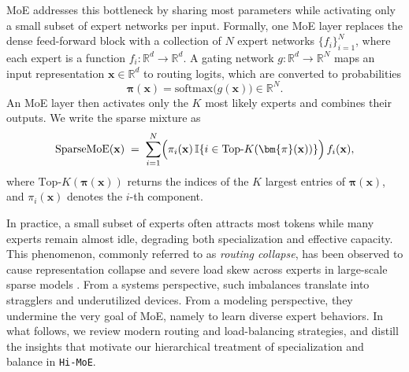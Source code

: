\documentclass[sigconf,nonacm]{acmart}
\newcommand{\x}{\mathbf{x}}
\begin{document}
MoE addresses this bottleneck by sharing most parameters while activating only a small subset of expert networks per input. 
Formally, one MoE layer replaces the dense feed-forward block with a collection of $N$ expert networks $\{f_i\}_{i=1}^N$, where each expert is a function $f_i:\mathbb{R}^d \rightarrow \mathbb{R}^d$.
A gating network $g:\mathbb{R}^d \rightarrow \mathbb{R}^N$ maps an input representation $\x \in \mathbb{R}^d$ to routing logits, which are converted to probabilities
\[
\bm{\pi}(\x) = \mathrm{softmax}\bigl(g(\x)\bigr) \in \mathbb{R}^N.
\]
An MoE layer then activates only the $K$ most likely experts and combines their outputs.
We write the sparse mixture as
\begin{equation}
\mathrm{SparseMoE}(\x)
\;=\;
\sum_{i=1}^{N}
\Bigl(
\pi_i(\x)\,\mathbb{I}\{ i \in \mathrm{Top}\text{-}K(\bm{\pi}(\x)) \}
\Bigr)\, f_i(\x),
\label{eq:standard_moe}
\end{equation}
where $\mathrm{Top}\text{-}K(\bm{\pi}(\x))$ returns the indices of the $K$ largest entries of $\bm{\pi}(\x)$, and $\pi_i(\x)$ denotes the $i$-th component.

In practice, a small subset of experts often attracts most tokens while many experts remain almost idle, degrading both specialization and effective capacity.
This phenomenon, commonly referred to as \emph{routing collapse}, has been observed to cause representation collapse and severe load skew across experts in large-scale sparse models \citep{representationcollapse}.
From a systems perspective, such imbalances translate into stragglers and underutilized devices. From a modeling perspective, they undermine the very goal of MoE, namely to learn diverse expert behaviors.
In what follows, we review modern routing and load-balancing strategies, and distill the insights that motivate our hierarchical treatment of specialization and balance in \texttt{Hi-MoE}.

\begingroup
\renewcommand{\thefootnote}{}%
\addtocounter{footnote}{-1}%
\endgroup
\end{document}
